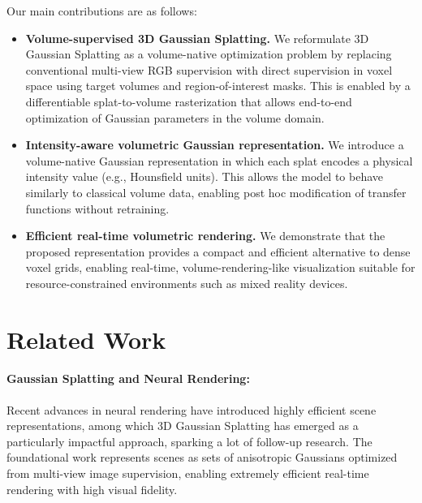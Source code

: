 \documentclass[runningheads]{llncs}
\begin{document}

Our main contributions are as follows:

\begin{itemize}

\item \textbf{Volume-supervised 3D Gaussian Splatting.}
We reformulate 3D Gaussian Splatting as a volume-native optimization problem by replacing conventional multi-view RGB supervision with direct supervision in voxel space using target volumes and region-of-interest masks. This is enabled by a differentiable splat-to-volume rasterization that allows end-to-end optimization of Gaussian parameters in the volume domain.

\item \textbf{Intensity-aware volumetric Gaussian representation.}
We introduce a volume-native Gaussian representation in which each splat encodes a physical intensity value (e.g., Hounsfield units). This allows the model to behave similarly to classical volume data, enabling post hoc modification of transfer functions without retraining.

\item \textbf{Efficient real-time volumetric rendering.}
We demonstrate that the proposed representation provides a compact and efficient alternative to dense voxel grids, enabling real-time, volume-rendering-like visualization suitable for resource-constrained environments such as mixed reality devices.

\end{itemize}


\section{Related Work}

\paragraph{Gaussian Splatting and Neural Rendering:}
Recent advances in neural rendering have introduced highly efficient scene representations, among which 3D Gaussian Splatting \cite{kerbl2023gaussiansplatting} has emerged as a particularly impactful approach, sparking a lot of follow-up research. The foundational work represents scenes as sets of anisotropic Gaussians optimized from multi-view image supervision, enabling extremely efficient real-time rendering with high visual fidelity.
\end{document}
